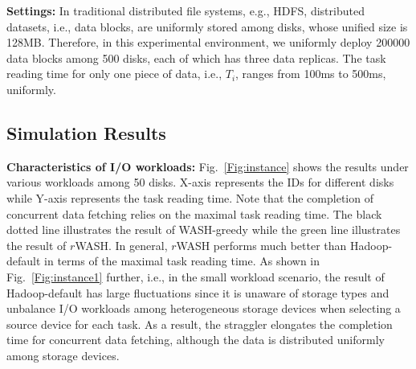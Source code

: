\documentclass[conference]{IEEEtran}
\begin{document}

\textbf{Settings:}
In traditional distributed file systems, e.g., HDFS\cite{b19}, distributed datasets, i.e., data blocks, are uniformly stored among disks, whose unified size is 128MB. Therefore, in this experimental environment, we uniformly deploy 200000 data blocks among 500 disks, each of which has three data replicas. The task reading time for only one piece of data, i.e., $T_i$, ranges from 100ms to 500ms, uniformly. 



\subsection{Simulation Results}

\textbf{Characteristics of I/O workloads:} Fig.~\ref{Fig:instance} shows the results under various workloads among 50 disks. X-axis represents the IDs for different disks while Y-axis represents the task reading time. Note that the completion of concurrent data fetching relies on the maximal task reading time. The black dotted line illustrates the result of WASH-greedy while the green line illustrates the result of $r$WASH. In general, $r$WASH performs much better than Hadoop-default in terms of the maximal task reading time. As shown in Fig.~\ref{Fig:instance1} further, i.e., in the small workload scenario, the result of Hadoop-default has large fluctuations since it is unaware of storage types and unbalance I/O workloads among heterogeneous storage devices when selecting a source device for each task. As a result, the straggler elongates the completion time for concurrent data fetching, although the data is distributed uniformly among storage devices.
\end{document}

